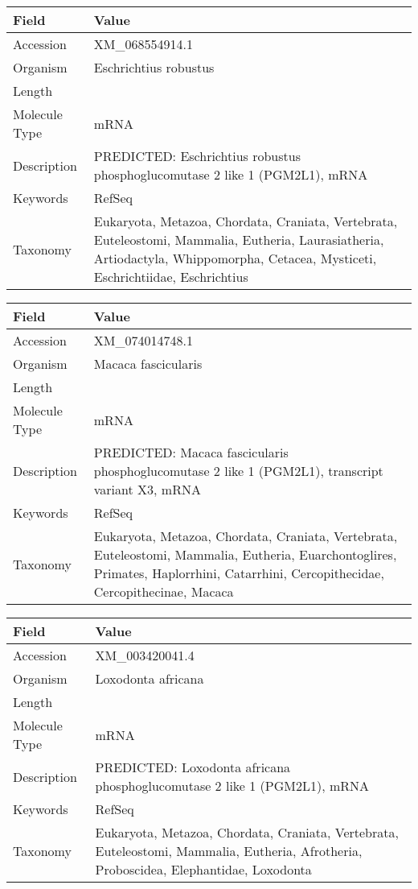 \documentclass[10pt]{article}
\begin{document}
\vspace{1em}
{\footnotesize
\begin{longtable}{>{\raggedright\arraybackslash}p{4.5cm} >{\raggedright\arraybackslash}p{11.5cm}}
\textbf{Field} & \textbf{Value} \\
\hline
Accession & XM\_068554914.1 \\
Organism & Eschrichtius robustus \\
Length & 2324 \\
Molecule Type & mRNA \\
Description & PREDICTED: Eschrichtius robustus phosphoglucomutase 2 like 1 (PGM2L1), mRNA \\
Keywords & RefSeq \\
Taxonomy & Eukaryota, Metazoa, Chordata, Craniata, Vertebrata, Euteleostomi, Mammalia, Eutheria, Laurasiatheria, Artiodactyla, Whippomorpha, Cetacea, Mysticeti, Eschrichtiidae, Eschrichtius \\
\end{longtable}
}

\vspace{1em}
{\footnotesize
\begin{longtable}{>{\raggedright\arraybackslash}p{4.5cm} >{\raggedright\arraybackslash}p{11.5cm}}
\textbf{Field} & \textbf{Value} \\
\hline
Accession & XM\_074014748.1 \\
Organism & Macaca fascicularis \\
Length & 3874 \\
Molecule Type & mRNA \\
Description & PREDICTED: Macaca fascicularis phosphoglucomutase 2 like 1 (PGM2L1), transcript variant X3, mRNA \\
Keywords & RefSeq \\
Taxonomy & Eukaryota, Metazoa, Chordata, Craniata, Vertebrata, Euteleostomi, Mammalia, Eutheria, Euarchontoglires, Primates, Haplorrhini, Catarrhini, Cercopithecidae, Cercopithecinae, Macaca \\
\end{longtable}
}

\vspace{1em}
{\footnotesize
\begin{longtable}{>{\raggedright\arraybackslash}p{4.5cm} >{\raggedright\arraybackslash}p{11.5cm}}
\textbf{Field} & \textbf{Value} \\
\hline
Accession & XM\_003420041.4 \\
Organism & Loxodonta africana \\
Length & 5289 \\
Molecule Type & mRNA \\
Description & PREDICTED: Loxodonta africana phosphoglucomutase 2 like 1 (PGM2L1), mRNA \\
Keywords & RefSeq \\
Taxonomy & Eukaryota, Metazoa, Chordata, Craniata, Vertebrata, Euteleostomi, Mammalia, Eutheria, Afrotheria, Proboscidea, Elephantidae, Loxodonta \\
\end{longtable}
}
\end{document}
